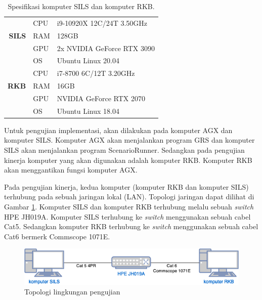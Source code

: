 \begin{table}[!htbp]
	\centering
	\begin{tabular}{|r|l|l|}
		\hline
		              & CPU & i9-10920X 12C/24T 3.50GHz  \\
		\cline{2-3}
		\textbf{SILS} & RAM & 128GB                      \\
		\cline{2-3}
		              & GPU & 2x NVIDIA GeForce RTX 3090 \\
		\cline{2-3}
		              & OS  & Ubuntu Linux 20.04         \\
		\hline
		              & CPU & i7-8700 6C/12T 3.20GHz     \\
		\cline{2-3}
		\textbf{RKB}  & RAM & 16GB                       \\
		\cline{2-3}
		              & GPU & NVIDIA GeForce RTX 2070    \\
		\cline{2-3}
		              & OS  & Ubuntu Linux 18.04         \\
		\hline
	\end{tabular}
	\label{chapter-4-tbl-environment-specs}
	\caption{Spesifikasi komputer SILS dan komputer RKB.}
\end{table}

Untuk pengujian implementasi, akan dilakukan pada komputer AGX dan komputer
SILS. Komputer AGX akan menjalankan program GRS dan komputer SILS akan
menjalankan program ScenarioRunner. Sedangkan pada pengujian kinerja komputer
yang akan digunakan adalah komputer RKB. Komputer RKB akan menggantikan fungsi
komputer AGX.

Pada pengujian kinerja, kedua komputer (komputer RKB dan komputer SILS)
terhubung pada sebuah jaringan lokal (LAN). Topologi jaringan dapat dilihat di
Gambar \ref{chapter-4-fig-topology}. Komputer SILS dan komputer RKB terhubung
melalu sebuah \textit{switch} HPE JH019A. Komputer SILS terhubung ke
\textit{switch} menggunakan sebuah cabel Cat5. Sedangkan komputer RKB terhubung
ke \textit{switch} menggunakan sebuah cabel Cat6 bermerk Commscope 1071E.

\begin{figure}[!htbp]
	\centering
	\includegraphics[width=1.0\textwidth]{resources/chapter-4/test-environment-network-topology.png}
	\caption{Topologi lingkungan pengujian}
	\label{chapter-4-fig-topology}
\end{figure}

